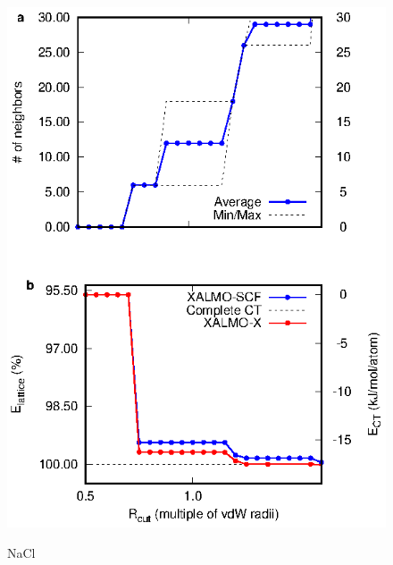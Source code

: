 \documentclass[aps,prb,twocolumn,amsmath,amssymb,superscriptaddress,longbibliography]{revtex4-1}
\begin{document}
%

\begin{figure}
\includegraphics[scale=1]{./plots/NaCl_EvR}
\label{nacl}
\caption{NaCl}
\end{figure}
\end{document}
